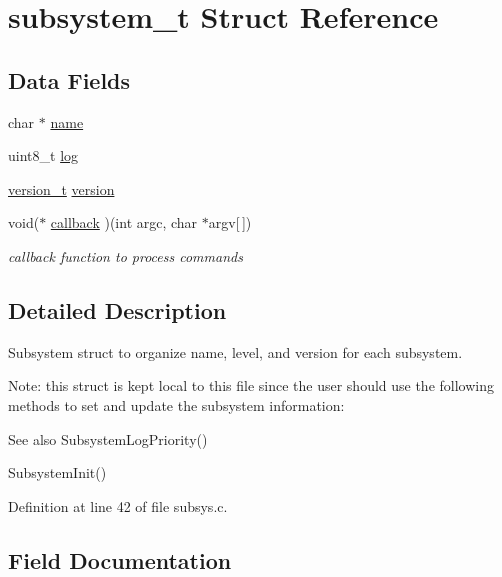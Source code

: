 \hypertarget{structsubsystem__t}{}\section{subsystem\+\_\+t Struct Reference}
\label{structsubsystem__t}
\subsection*{Data Fields}
\begin{DoxyCompactItemize}
\item 
char $\ast$ \hyperlink{structsubsystem__t_a5ac083a645d964373f022d03df4849c8}{name}
\item 
uint8\+\_\+t \hyperlink{structsubsystem__t_ae001c74b249ea53b90cc573c1ca7699b}{log}
\item 
\hyperlink{unionversion__t}{version\+\_\+t} \hyperlink{structsubsystem__t_a0a8052c72b7c10557400c8df1e52946e}{version}
\item 
void($\ast$ \hyperlink{structsubsystem__t_a0ca91c56697bfb67aa0d631ae0d27085}{callback} )(int argc, char $\ast$argv\mbox{[}$\,$\mbox{]})
\begin{DoxyCompactList}\small\item\em callback function to process commands \end{DoxyCompactList}\end{DoxyCompactItemize}


\subsection{Detailed Description}
Subsystem struct to organize name, level, and version for each subsystem.

Note\+: this struct is kept local to this file since the user should use the following methods to set and update the subsystem information\+: \begin{DoxySeeAlso}{See also}
Subsystem\+Log\+Priority() 

Subsystem\+Init() 
\end{DoxySeeAlso}


Definition at line 42 of file subsys.\+c.



\subsection{Field Documentation}
\hypertarget{structsubsystem__t_a0ca91c56697bfb67aa0d631ae0d27085}{}
